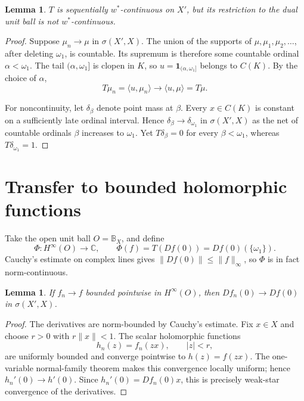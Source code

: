 \documentclass[10pt]{article}
\newtheorem{lemma}[theorem]{Lemma}
\newcommand{\C}{\mathbb C}
\newcommand{\B}{\mathbb B}
\newcommand{\Hin}{H^\infty}
\newcommand{\wstar}{w^*}
\begin{document}
\begin{lemma}\label{lem:T}
$T$ is sequentially $\wstar$-continuous on $X'$, but its restriction to
the dual unit ball is not $\wstar$-continuous.
\end{lemma}

\begin{proof}
Suppose $\mu_n\to\mu$ in $\sigma(X',X)$.  The union of the supports of
$\mu,\mu_1,\mu_2,\ldots$, after deleting $\omega_1$, is countable.  Its
supremum is therefore some countable ordinal $\alpha<\omega_1$.  The tail
$(\alpha,\omega_1]$ is clopen in $K$, so
$u=\mathbf 1_{(\alpha,\omega_1]}$ belongs to $C(K)$.  By the choice of
$\alpha$,
\[
 T\mu_n=\langle u,\mu_n\rangle\longrightarrow
 \langle u,\mu\rangle=T\mu.
\]

For noncontinuity, let $\delta_\beta$ denote point mass at $\beta$.  Every
$x\in C(K)$ is constant on a sufficiently late ordinal interval.  Hence
$\delta_\beta\to\delta_{\omega_1}$ in $\sigma(X',X)$ as the net of
countable ordinals $\beta$ increases to $\omega_1$.  Yet
$T\delta_\beta=0$ for every $\beta<\omega_1$, whereas
$T\delta_{\omega_1}=1$.
\end{proof}

\section{Transfer to bounded holomorphic functions}

Take the open unit ball $O=\B_X$, and define
\begin{equation}\label{eq:Phi}
 \Phi:\Hin(O)\longrightarrow\C,
 \qquad \Phi(f)=T(Df(0))=Df(0)(\{\omega_1\}).
\end{equation}
Cauchy's estimate on complex lines gives
$\|Df(0)\|\leq\|f\|_\infty$, so $\Phi$ is in fact norm-continuous.

\begin{lemma}\label{lem:derivative}
If $f_n\to f$ bounded pointwise in $\Hin(O)$, then
$Df_n(0)\to Df(0)$ in $\sigma(X',X)$.
\end{lemma}

\begin{proof}
The derivatives are norm-bounded by Cauchy's estimate.  Fix $x\in X$ and
choose $r>0$ with $r\|x\|<1$.  The scalar holomorphic functions
\[
 h_n(z)=f_n(zx),\qquad |z|<r,
\]
are uniformly bounded and converge pointwise to $h(z)=f(zx)$.  The
one-variable normal-family theorem makes this convergence locally uniform;
hence $h_n'(0)\to h'(0)$.  Since
$h_n'(0)=Df_n(0)x$, this is precisely weak-star convergence of the
derivatives.
\end{proof}
\end{document}
